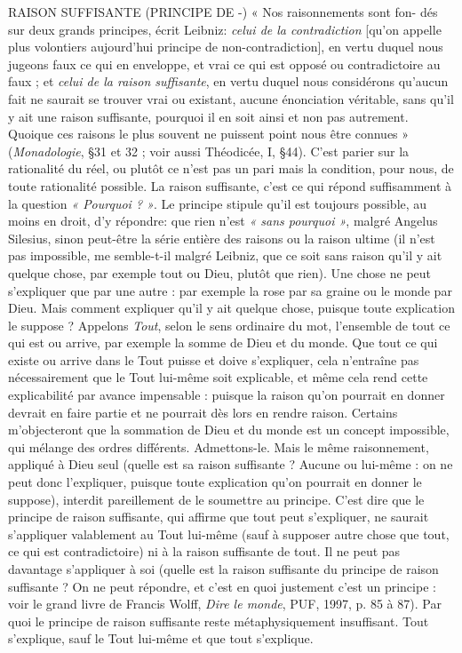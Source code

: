 RAISON SUFFISANTE (PRINCIPE DE -) « Nos raisonnements sont fon-
dés sur deux grands principes,
écrit Leibniz: {\it celui de la contradiction} [qu’on appelle plus volontiers
aujourd’hui principe de non-contradiction], en vertu duquel nous jugeons
faux ce qui en enveloppe, et vrai ce qui est opposé ou contradictoire au faux ;
et {\it celui de la raison suffisante}, en vertu duquel nous considérons qu'aucun fait
ne saurait se trouver vrai ou existant, aucune énonciation véritable, sans qu'il
y ait une raison suffisante, pourquoi il en soit ainsi et non pas autrement.
Quoique ces raisons le plus souvent ne puissent point nous être connues »
({\it Monadologie}, \S 31 et 32 ; voir aussi Théodicée, I, \S 44). C’est parier sur la
rationalité du réel, ou plutôt ce n’est pas un pari mais la condition, pour
nous, de toute rationalité possible. La raison suffisante, c’est ce qui répond
suffisamment à la question {\it « Pourquoi ? »}. Le principe stipule qu’il est toujours
possible, au moins en droit, d'y répondre: que rien n’est {\it « sans
pourquoi »}, malgré Angelus Silesius, sinon peut-être la série entière des raisons
ou la raison ultime (il n’est pas impossible, me semble-t-il malgré Leibniz,
que ce soit sans raison qu'il y ait quelque chose, par exemple tout ou
Dieu, plutôt que rien). Une chose ne peut s’expliquer que par une autre : par
exemple la rose par sa graine ou le monde par Dieu. Mais comment expliquer
qu'il y ait quelque chose, puisque toute explication le suppose ? Appelons
{\it Tout}, selon le sens ordinaire du mot, l’ensemble de tout ce qui est ou arrive,
par exemple la somme de Dieu et du monde. Que tout ce qui existe ou arrive
dans le Tout puisse et doive s'expliquer, cela n’entraîne pas nécessairement
que le Tout lui-même soit explicable, et même cela rend cette explicabilité
par avance impensable : puisque la raison qu’on pourrait en donner devrait
en faire partie et ne pourrait dès lors en rendre raison. Certains m’objecteront
que la sommation de Dieu et du monde est un concept impossible, qui
mélange des ordres différents. Admettons-le. Mais le même raisonnement,
appliqué à Dieu seul (quelle est sa raison suffisante ? Aucune ou lui-même :
on ne peut donc l’expliquer, puisque toute explication qu’on pourrait en
donner le suppose), interdit pareillement de le soumettre au principe. C’est
dire que le principe de raison suffisante, qui affirme que tout peut s’expliquer,
ne saurait s’appliquer valablement au Tout lui-même (sauf à supposer
autre chose que tout, ce qui est contradictoire) ni à la raison suffisante de
tout. Il ne peut pas davantage s’appliquer à soi (quelle est la raison suffisante
du principe de raison suffisante ? On ne peut répondre, et c’est en quoi justement
c’est un principe : voir le grand livre de Francis Wolff, {\it Dire le monde},
PUF, 1997, p. 85 à 87). Par quoi le principe de raison suffisante reste métaphysiquement
insuffisant. Tout s'explique, sauf le Tout lui-même et que tout
s'explique.

